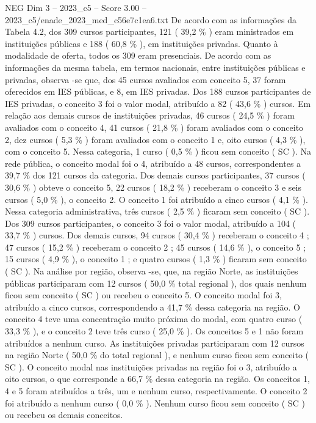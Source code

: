 \begin{textsample}{NEG Dim 3 – 2023\_c5 – Score 3.00 – 2023\_c5/enade\_2023\_med\_c56e7c1ea6.txt}
De acordo com as informações da Tabela 4.2, dos 309 cursos participantes, 121 ( 39,2 \% ) eram ministrados em instituições públicas e 188 ( 60,8 \% ), em instituições privadas.
Quanto à modalidade de oferta, todos os 309 eram presenciais.
De acordo com as informações da mesma tabela, em termos nacionais, entre instituições públicas e privadas, observa -se que, dos 45 cursos avaliados com conceito 5, 37 foram oferecidos em IES públicas, e 8, em IES privadas.
Dos 188 cursos participantes de IES privadas, o conceito 3 foi o valor modal, atribuído a 82 ( 43,6 \% ) cursos.
Em relação aos demais cursos de instituições privadas, 46 cursos ( 24,5 \% ) foram avaliados com o conceito 4, 41 cursos ( 21,8 \% ) foram avaliados com o conceito 2, dez cursos ( 5,3 \% ) foram avaliados com o conceito 1 e, oito cursos ( 4,3 \% ), com o conceito 5.
Nessa categoria, 1 curso ( 0,5 \% ) ficou sem conceito ( SC ).
Na rede pública, o conceito modal foi o 4, atribuído a 48 cursos, correspondentes a 39,7 \% dos 121 cursos da categoria.
Dos demais cursos participantes, 37 cursos ( 30,6 \% ) obteve o conceito 5, 22 cursos ( 18,2 \% ) receberam o conceito 3 e seis cursos ( 5,0 \% ), o conceito 2.
O conceito 1 foi atribuído a cinco cursos ( 4,1 \% ).
Nessa categoria administrativa, três cursos ( 2,5 \% ) ficaram sem conceito ( SC ).
Dos 309 cursos participantes, o conceito 3 foi o valor modal, atribuído a 104 ( 33,7 \% ) cursos.
Dos demais cursos, 94 cursos ( 30,4 \% ) receberam o conceito 4 ; 47 cursos ( 15,2 \% ) receberam o conceito 2 ; 45 cursos ( 14,6 \% ), o conceito 5 ; 15 cursos ( 4,9 \% ), o conceito 1 ; e quatro cursos ( 1,3 \% ) ficaram sem conceito ( SC ).
Na análise por região, observa -se, que, na região Norte, as instituições públicas participaram com 12 cursos ( 50,0 \% total regional ), dos quais nenhum ficou sem conceito ( SC ) ou recebeu o conceito 5.
O conceito modal foi 3, atribuído a cinco cursos, correspondendo a 41,7 \% dessa categoria na região.
O conceito 4 teve uma concentração muito próxima do modal, com quatro curso ( 33,3 \% ), e o conceito 2 teve três curso ( 25,0 \% ).
Os conceitos 5 e 1 não foram atribuídos a nenhum curso.
As instituições privadas participaram com 12 cursos na região Norte ( 50,0 \% do total regional ), e nenhum curso ficou sem conceito ( SC ).
O conceito modal nas instituições privadas na região foi o 3, atribuído a oito cursos, o que corresponde a 66,7 \% dessa categoria na região.
Os conceitos 1, 4 e 5 foram atribuídos a três, um e nenhum curso, respectivamente.
O conceito 2 foi atribuído a nenhum curso ( 0,0 \% ).
Nenhum curso ficou sem conceito ( SC ) ou recebeu os demais conceitos.

\end{textsample}
